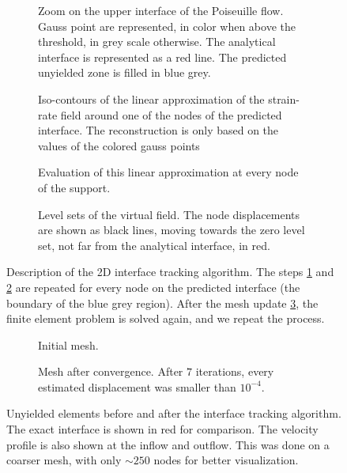 \documentclass[11 pt]{report}
\begin{document}
\vfill
\begin{figure}[H]
    \centering
    \begin{subfigure}[t]{0.48\textwidth}
        
        \caption{Zoom on the upper interface of the Poiseuille flow. Gauss point are represented, in color when above the threshold, in grey scale otherwise. The analytical interface is represented as a red line. The predicted unyielded zone is filled in blue grey.}
    \end{subfigure}\hfill
    \begin{subfigure}[t]{0.48\textwidth}
        
        \caption{Iso-contours of the linear approximation of the strain-rate field around one of the nodes of the predicted interface. The reconstruction is only based on the values of the colored gauss points}
        \label{fig:build_approx}
    \end{subfigure}\vspace{20pt}
    \begin{subfigure}[t]{0.48\textwidth}
        
        \caption{Evaluation of this linear approximation at every node of the support.}
        \label{fig:eval_approx}
    \end{subfigure}\hfill
    \begin{subfigure}[t]{0.48\textwidth}
        
        \caption{Level sets of the virtual field. The node displacements are shown as black lines, moving towards the zero level set, not far from the analytical interface, in red.}
        \label{fig:targets}
    \end{subfigure}
    \caption{Description of the 2D interface tracking algorithm. The steps \ref{fig:build_approx} and \ref{fig:eval_approx} are repeated for every node on the predicted interface (the boundary of the blue grey region). After the mesh update \ref{fig:targets}, the finite element problem is solved again, and we repeat the process.}
    \label{fig:rec2d_a}
\end{figure}
\vfill

\begin{figure}[H]
    \centering
    \begin{subfigure}[t]{\textwidth}
        
        \caption{Initial mesh.}
    \end{subfigure}
    \begin{subfigure}[t]{\textwidth}
        
        \caption{Mesh after convergence. After $7$ iterations, every estimated displacement was smaller than $10^{-4}$.}
    \end{subfigure}
    \caption{Unyielded elements before and after the interface tracking algorithm. The exact interface is shown in red for comparison. The velocity profile is also shown at the inflow and outflow. This was done on a coarser mesh, with only $\sim 250$ nodes for better visualization.}
\end{figure}
\end{document}
